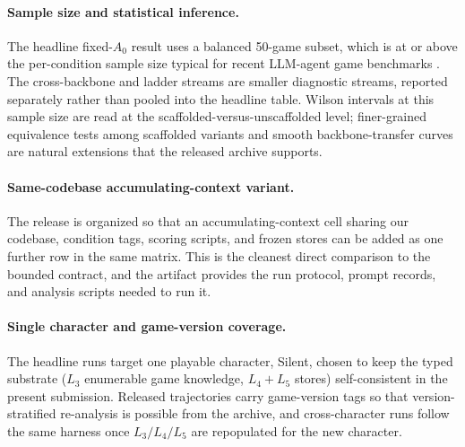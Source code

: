 
\paragraph{Sample size and statistical inference.}
The headline fixed-$A_0$ result uses a balanced 50-game subset,
which is at or above the per-condition sample size typical for
recent LLM-agent game benchmarks
\citep{voyager2023,balrog2024,lmgame-bench-2025}. The
cross-backbone and ladder streams are smaller diagnostic streams,
reported separately rather than pooled into the headline table.
Wilson intervals at this sample size are read at the
scaffolded-versus-unscaffolded level; finer-grained equivalence
tests among scaffolded variants and smooth backbone-transfer
curves are natural extensions that the released archive supports.

\paragraph{Same-codebase accumulating-context variant.}
The release is organized so that an accumulating-context cell
sharing our codebase, condition tags, scoring scripts, and frozen
stores can be added as one further row in the same matrix. This is
the cleanest direct comparison to the bounded contract, and the
artifact provides the run protocol, prompt records, and analysis
scripts needed to run it.

\paragraph{Single character and game-version coverage.}
The headline runs target one playable character, Silent, chosen to
keep the typed substrate ($L_3$ enumerable game knowledge,
$L_4{+}L_5$ stores) self-consistent in the present submission.
Released trajectories carry game-version tags so that
version-stratified re-analysis is possible from the archive, and
cross-character runs follow the same harness once $L_3/L_4/L_5$
are repopulated for the new character.

